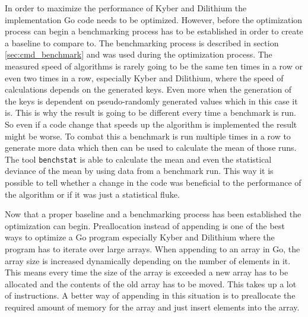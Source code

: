 In order to maximize the performance of Kyber and Dilithium the implementation Go code needs to be optimized. However, before the optimization process can begin a benchmarking process has to be established in order to create a baseline to compare to. The benchmarking process is described in section \ref{sec:cmd_benchmark} and was used during the optimization process. The measured speed of algorithms is rarely going to be the same ten times in a row or even two times in a row, especially Kyber and Dilithium, where the speed of calculations depends on the generated keys. Even more when the generation of the keys is dependent on pseudo-randomly generated values which in this case it is. This is why the result is going to be different every time a benchmark is run. So even if a code change that speeds up the algorithm is implemented the result might be worse. To combat this a benchmark is run multiple times in a row to generate more data which then can be used to calculate the mean of those runs. The tool \texttt{benchstat} is able to calculate the mean and even the statistical deviance of the mean by using data from a benchmark run. This way it is possible to tell whether a change in the code was beneficial to the performance of the algorithm or if it was just a statistical fluke.

Now that a proper baseline and a benchmarking process has been established the optimization can begin. Preallocation instead of appending is one of the best ways to optimize a Go program especially Kyber and Dilithium where the program has to iterate over large arrays. When appending to an array in Go, the array size is increased dynamically depending on the number of elements in it. This means every time the size of the array is exceeded a new array has to be allocated and the contents of the old array has to be moved. This takes up a lot of instructions. A better way of appending in this situation is to preallocate the required amount of memory for the array and just insert elements into the array.

